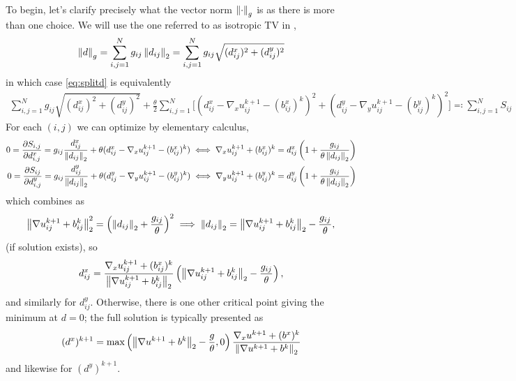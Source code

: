 To begin, let's clarify precisely what the vector norm $\left\lVert\cdot \right\rVert_g$ is as there is more than one choice. We will use the one referred to as isotropic TV in \cite{goldstein2009split},
\begin{align*}
\left\lVert d \right\rVert_g 
= \sum^N_{i,j = 1} g_{ij} \left\lVert d_{ij}\right\rVert_2 
= \sum^{N}_{i,j = 1} g_{ij} \sqrt{ (d^x_{ij} )^2 + (d^y_{ij} )^2 }
\end{align*}
in which case \eqref{eq:splitd} is equivalently 
\begin{align*}
\sum^{N}_{i,j = 1} g_{ij} \sqrt{ (d^x_{ij} )^2 + (d^y_{ij} )^2 }
+ \frac{\theta}{2} \sum^N_{i,j=1} \big[ (d^x_{ij} - \nabla_x u^{k+1}_{ij} - (b^x_{ij})^k)^2 
+ (d^y_{ij} - \nabla_y u^{k+1}_{ij} - (b^y_{ij})^k)^2 
\big]
\eqqcolon \sum^N_{i,j=1} S_{ij}
\end{align*}
For each $(i,j)$ we can optimize by elementary calculus, 
\begin{align*}
0
=\frac{\partial S_{i,j}}{\partial d^x_{i,j}} 
= g_{ij}\frac{d^x_{ij}}{ \left\lVert d_{ij}\right\rVert_2}
+ \theta (d^x_{ij} - \nabla_x u^{k+1}_{ij} - (b^x_{ij})^k) 
\iff
\nabla_x u^{k+1}_{ij} + (b^x_{ij})^k  
= d^x_{ij} \left( 1 + \frac{g_{ij}}{\theta \left\lVert d_{ij}\right\rVert_2}
\right)
\\
0
=\frac{\partial S_{ij}}{\partial d^y_{i,j}} 
= g_{ij}\frac{d^y_{ij}}{ \left\lVert d_{ij}\right\rVert_2}
+ \theta (d^y_{ij} - \nabla_y u^{k+1}_{ij} - (b^y_{ij})^k) 
\iff
\nabla_y u^{k+1}_{ij} + (b^y_{ij})^k 
= d^y_{ij} \left( 1 + \frac{g_{ij}}{\theta\left\lVert d_{ij}\right\rVert_2}
\right)
\end{align*}
which combines as 
\begin{align*}
\left\lVert\nabla u^{k+1}_{ij} + b^k_{ij}\right\rVert_2^2 = \left(\left\lVert d_{ij}\right\rVert_2 + \frac{g_{ij}}{\theta}
\right)^2
\implies 
\left\lVert d_{ij}\right\rVert_2 = \left\lVert\nabla u^{k+1}_{ij} + b^k_{ij} \right\rVert_2 - \frac{g_{ij}}{\theta},
\end{align*}
(if solution exists), so
\begin{align*}
d_{ij}^x 
= \frac{ \nabla_x u^{k+1}_{ij} + (b^x_{ij})^k }{ \left\lVert\nabla u^{k+1}_{ij} + b^k_{ij} \right\rVert_2} \left( \left\lVert\nabla u^{k+1}_{ij} + b^k_{ij} \right\rVert_2 - \frac{g_{ij}}{\theta} \right), 
\end{align*}
and similarly for $d^y_{ij}$. Otherwise, there is one other critical point giving the minimum at $d = 0$; the full solution is typically presented as 
\begin{align}
(d^x)^{k+1} 
= \max\left( \left\lVert \nabla u^{k+1} + b^k\right\rVert_2 - \frac{g}{\theta}, 0 \right) \frac{ \nabla_x u^{k+1} + (b^x)^k}{ \left\lVert \nabla u^{k+1} + b^k\right\rVert_2}
\label{eq:sbdij}
\end{align}
and likewise for $(d^y)^{k+1}$.

